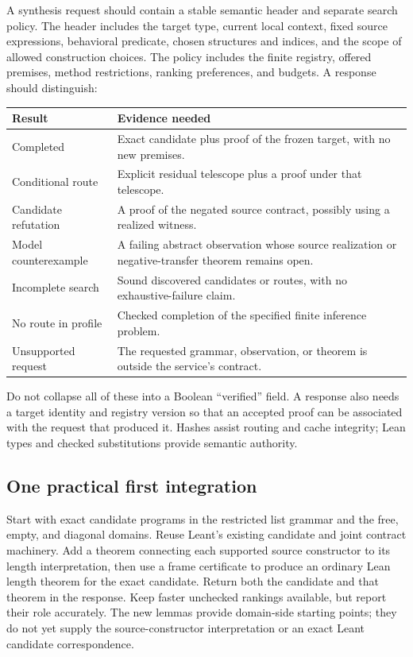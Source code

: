 \documentclass[11pt,letterpaper]{article}
\newcommand{\code}[1]{\texttt{\detokenize{#1}}}
\theoremstyle{definition}\newtheorem{definition}[proposition]{Definition}
\theoremstyle{remark}\newtheorem{remark}[proposition]{Remark}
\begin{document}
A synthesis request should contain a stable semantic header and separate
search policy. The header includes the target type, current local context,
fixed source expressions, behavioral predicate, chosen structures and indices,
and the scope of allowed construction choices. The policy includes the finite
registry, offered premises, method restrictions, ranking preferences, and
budgets. A response should distinguish:
\begin{center}\small
\begin{tabularx}{\textwidth}{@{}P{0.24\textwidth}Y@{}}
\toprule Result & Evidence needed\\\midrule
Completed & Exact candidate plus proof of the frozen target, with no new premises.\\
Conditional route & Explicit residual telescope plus a proof under that telescope.\\
Candidate refutation & A proof of the negated source contract, possibly using a realized witness.\\
Model counterexample & A failing abstract observation whose source realization or negative-transfer theorem remains open.\\
Incomplete search & Sound discovered candidates or routes, with no exhaustive-failure claim.\\
No route in profile & Checked completion of the specified finite inference problem.\\
Unsupported request & The requested grammar, observation, or theorem is outside the service's contract.\\
\bottomrule
\end{tabularx}
\end{center}
Do not collapse all of these into a Boolean ``verified'' field. A response
also needs a target identity and registry version so that an accepted proof
can be associated with the request that produced it. Hashes assist routing
and cache integrity; Lean types and checked substitutions provide semantic
authority.

\subsection{One practical first integration}

Start with exact candidate programs in the restricted list grammar and the
free, empty, and diagonal domains. Reuse Leant's existing candidate and joint
contract machinery. Add a theorem connecting each supported source constructor
to its length interpretation, then use a frame certificate to produce an
ordinary Lean length theorem for the exact candidate. Return both the candidate
and that theorem in the response. Keep faster unchecked rankings available,
but report their role accurately.
The new \code{ListImage.lean} lemmas provide domain-side starting points;
they do not yet supply the source-constructor interpretation or an exact
Leant candidate correspondence.
\end{document}
